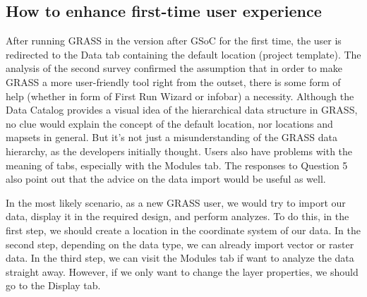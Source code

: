\documentclass[a4paper,10pt,twoside]{article}
\begin{document}
\subsection{How to enhance first-time user experience}
\label{sec:proposal1}

After running GRASS in the version after GSoC for the first time, the 
user is redirected to the Data tab containing the default location (project template). 
The analysis of the second survey confirmed the
assumption that in order to make GRASS a more user-friendly tool right
from the outset, there is some form of help (whether in form of First
Run Wizard or infobar) a necessity. Although the Data Catalog
provides a visual idea of the hierarchical data structure in GRASS, no
clue would explain the concept of the default location, nor locations
and mapsets in general. But it's not just a misunderstanding of the
GRASS data hierarchy, as the developers initially thought. Users also
have problems with the meaning of tabs, especially with the Modules
tab. The responses to Question 5 also point out that the advice on the
data import would be useful as well.

In the most likely scenario, as a new GRASS user, we would try to
import our data, display it in the required design, and perform
analyzes. To do this, in the first step, we should create a location
in the coordinate system of our data. In the second step, depending on
the data type, we can already import vector or raster data. In the
third step, we can visit the Modules tab if want to analyze the data
straight away. However, if we only want to change the layer
properties, we should go to the Display tab.
\end{document}
